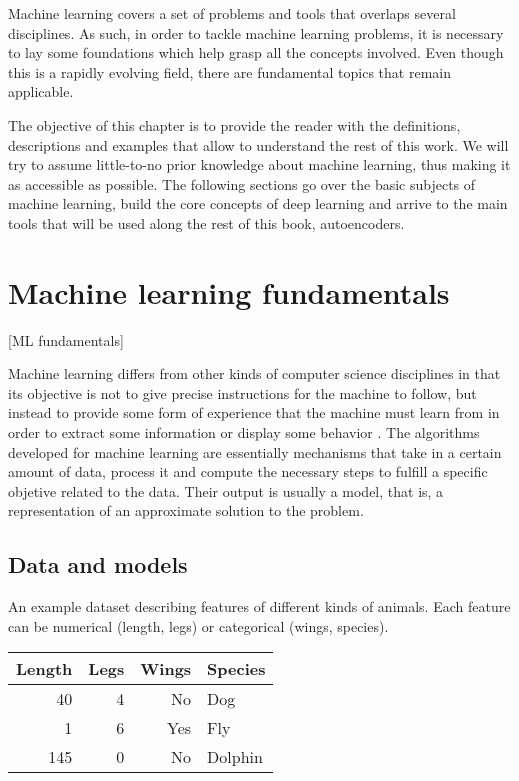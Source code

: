 
Machine learning covers a set of problems and tools that overlaps several disciplines. As such, in order to tackle machine learning problems, it is necessary to lay some foundations which help grasp all the concepts involved. Even though this is a rapidly evolving field, there are fundamental topics that remain applicable.

The objective of this chapter is to provide the reader with the definitions, descriptions and examples that allow to understand the rest of this work. We will try to assume little-to-no prior knowledge about machine learning, thus making it as accessible as possible. The following sections go over the basic subjects of machine learning, build the core concepts of deep learning and arrive to the main tools that will be used along the rest of this book, autoencoders.

\section{Machine learning fundamentals}[ML fundamentals]

Machine learning differs from other kinds of computer science disciplines in that its objective is not to give precise instructions for the machine to follow, but instead to provide some form of experience that the machine must learn from in order to extract some information or display some behavior . The algorithms developed for machine learning are essentially mechanisms that take in a certain amount of data, process it and compute the necessary steps to fulfill a specific objetive related to the data. Their output is usually a model, that is, a representation of an approximate solution to the problem. 
 
\subsection{Data and models}

\begin{margintable}
\caption{\label{tbl:dataset}An example dataset describing features of different kinds of animals. Each feature can be numerical (length, legs) or categorical (wings, species).}\footnotesize
\begin{tabular}{rrrl}\toprule
Length & Legs & Wings & Species\\\midrule
40 & 4 & No & Dog\\
1 & 6 & Yes & Fly\\
145 & 0 & No & Dolphin\\\bottomrule
\end{tabular}
\end{margintable}

